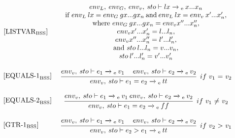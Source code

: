 \begin{equation}
\begin{minipage}{.2\linewidth}
$[\text{LISTVAR}_\text{BSS}]$
\end{minipage}
\begin{minipage}{.8\linewidth}
\centering
$env_L, \: env_G, \: env_v, \: sto \vdash lx \xrightarrow{}\textsubscript{e} \: x...x_n$  \\ if $env_L \: lx = env_G \: gx...gx_n \: \text{and} \: env_L \: lx = env_v \: x'...x'_n,$ \\ where $env_G \: gx...gx_n = env_v x''...x''_n,$ \\ $env_v x'...x'_n = l...l_n,$ \\ $env_v x''...x''_n = l'...l'_n,$ \\ and $sto \: l...l_n = v...v_n,$\\ $sto \: l'...l'_n = v'...v'_n$
\end{minipage}
\end{equation}


\begin{equation}
\begin{minipage}{.2\linewidth}
$[\text{EQUALS-1}_\text{BSS}]$
\end{minipage}
\begin{minipage}{.8\linewidth}
\centering
$\cfrac{env_v, \: sto \vdash e_1 \xrightarrow{}\textsubscript{e} \: v_1 \quad\: env_v, \: sto \vdash e_2 \xrightarrow{}\textsubscript{e} \: v_2}{env_v, \: sto \vdash e_1 = e_2 \xrightarrow{}\textsubscript{e} \: tt}$
$ \: if$ $v_1$ $=$ $v_2$
\end{minipage}
\end{equation}

\begin{equation}
\begin{minipage}{.2\linewidth}
$[\text{EQUALS-2}_\text{BSS}]$
\end{minipage}
\begin{minipage}{.8\linewidth}
\centering
$\cfrac{env_v, \: sto \vdash e_1 \xrightarrow{}\textsubscript{e} \: v_1 \: env_v, \: sto \vdash e_2 \xrightarrow{}\textsubscript{e} \: v_2}{env_v, \: sto \vdash e_1 = e_2 \xrightarrow{}\textsubscript{e} \: ff}$
$ \: if$ $v_1$ $\neq$ $v_2$
\end{minipage}
\end{equation}

\begin{equation}
\begin{minipage}{.2\linewidth}
$[\text{GTR-1}_\text{BSS}]$
\end{minipage}
\begin{minipage}{.8\linewidth}
\centering
$\cfrac{env_v, \: sto \vdash e_1 \xrightarrow{}\textsubscript{e} \: v_1 \quad\: env_v, \: sto \vdash e_2 \xrightarrow{}\textsubscript{e} \: v_2}{env_v, \: sto \vdash e_2 > e_1 \xrightarrow{}\textsubscript{e} \: tt}$
$ \: if$ $v_2$ $>$ $v_1$
\end{minipage}
\end{equation}

